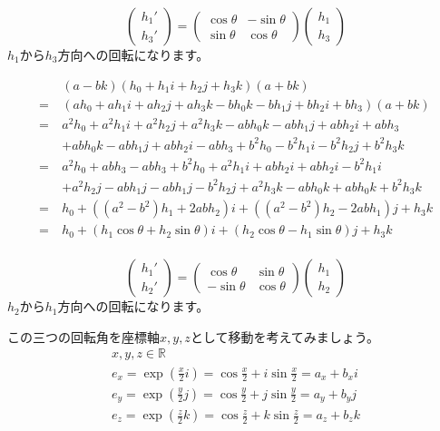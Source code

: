 \documentclass[a4paper,12pt,notitlepage]{jsreport}
\begin{document}
\begin{equation}
\begin{pmatrix}h_1'\\h_3'\end{pmatrix}
=\begin{pmatrix}\cos\theta&-\sin\theta\\\sin\theta&\cos\theta\end{pmatrix}
\begin{pmatrix}h_1\\h_3\end{pmatrix}
\end{equation}
$h_1$から$h_3$方向への回転になります。

\begin{equation}
\begin{split}
&(a-bk)(h_0+h_1i+h_2j+h_3k)(a+bk)\\
=~&(ah_0+ah_1i+ah_2j+ah_3k-bh_0k-bh_1j+bh_2i+bh_3)(a+bk)\\
=~&a^2h_0+a^2h_1i+a^2h_2j+a^2h_3k-abh_0k-abh_1j+abh_2i+abh_3\\
&+abh_0k-abh_1j+abh_2i-abh_3+b^2h_0-b^2h_1i-b^2h_2j+b^2h_3k\\
=~&a^2h_0+abh_3-abh_3+b^2h_0+a^2h_1i+abh_2i+abh_2i-b^2h_1i\\
&+a^2h_2j-abh_1j-abh_1j-b^2h_2j+a^2h_3k-abh_0k+abh_0k+b^2h_3k\\
=~&h_0+((a^2-b^2)h_1+2abh_2)i+((a^2-b^2)h_2-2abh_1)j+h_3k\\
=~&h_0+(h_1\cos\theta+h_2\sin\theta)i+(h_2\cos\theta-h_1\sin\theta)j+h_3k\\
\end{split}
\end{equation}

\begin{equation}
\begin{pmatrix}h_1'\\h_2'\end{pmatrix}
=\begin{pmatrix}\cos\theta&\sin\theta\\-\sin\theta&\cos\theta\end{pmatrix}
\begin{pmatrix}h_1\\h_2\end{pmatrix}
\end{equation}
$h_2$から$h_1$方向への回転になります。

この三つの回転角を座標軸$x,y,z$として移動を考えてみましょう。
\begin{gather}
x,y,z\in\mathbb{R}\\
e_x=\exp\left(\frac{x}{2}i\right)=\cos\frac{x}{2}+i\sin\frac{x}{2}=a_x+b_xi\\
e_y=\exp\left(\frac{y}{2}j\right)=\cos\frac{y}{2}+j\sin\frac{y}{2}=a_y+b_yj\\
e_z=\exp\left(\frac{z}{2}k\right)=\cos\frac{z}{2}+k\sin\frac{z}{2}=a_z+b_zk
\end{gather}
\end{document}
